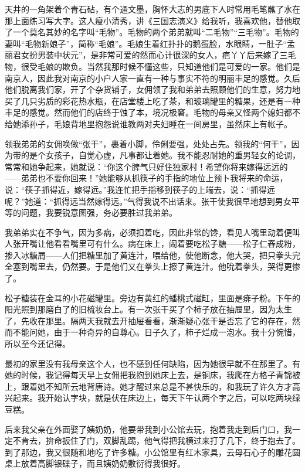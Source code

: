 \par 天井的一角架着个青石砧，有个通文墨，胸怀大志的男底下人时常用毛笔蘸了水在那上面练习写大字。这人瘦小清秀，讲《三国志演义》给我听，我喜欢他，替他取了一个莫名其妙的名字叫“毛物”。毛物的两个弟弟就叫“二毛物”“三毛物”。毛物的妻叫“毛物新娘子”，简称“毛娘”。毛娘生着红扑扑的鹅蛋脸，水眼睛，一肚子“孟丽君女扮男装中状元”，是非常可爱的然而心计很深的女人，疤丫丫后来嫁了三毛物，很受毛娘的欺负。当然我那时候不懂这些，只知道他们是可爱的一家。他们是南京人，因此我对南京的小户人家一直有一种与事实不符的明丽丰足的感觉。久后他们脱离我们家，开了个杂货铺子，女佣领了我和弟弟去照顾他们的生意，努力地买了几只劣质的彩花热水瓶，在店堂楼上吃了茶，和玻璃罐里的糖果，还是有一种丰足的感觉。然而他们的店终于蚀了本，境况极窘。毛物的母亲又怪两个媳妇都不给她添孙子，毛娘背地里抱怨说谁教两对夫妇睡在一间房里，虽然床上有帐子。
\par 领我弟弟的女佣唤做“张干”，裹着小脚，伶俐要强，处处占先。领我的“何干”，因为带的是个女孩子，自觉心虚，凡事都让着她。我不能忍耐她的重男轻女的论调，常常和她争起来，她就说：“你这个脾气只好住独家村！希望你将来嫁得远远的——弟弟也不要你回来！”她能够从抓筷子的手指的地位上预卜我将来的命运，说：“筷子抓得近，嫁得远。”我连忙把手指移到筷子的上端去，说：“抓得远呢？”她道：“抓得远当然嫁得远。”气得我说不出话来。张干使我很早地想到男女平等的问题，我要锐意图强，务必要胜过我弟弟。
\par 我弟弟实在不争气，因为多病，必须扣着吃，因此非常的馋，看见人嘴里动着便叫人张开嘴让他看看嘴里可有什么。病在床上，闹着要吃松子糖——松子仁舂成粉，掺入冰糖屑——人们把糖里加了黄连汁，喂给他，使他断念，他大哭，把只拳头完全塞到嘴里去，仍然要。于是他们又在拳头上擦了黄连汁。他吮着拳头，哭得更惨了。
\par 松子糖装在金耳的小花磁罐里。旁边有黄红的蟠桃式磁缸，里面是痱子粉。下午的阳光照到那磨白了的旧梳妆台上。有一次张干买了个柿子放在抽屉里，因为太生了，先收在那里。隔两天我就去开抽屉看看，渐渐疑心张干是否忘了它的存在，然而不能问她，由于一种奇异的自尊心。日子久了，柿子烂成一泡水。我十分惋惜，所以至今还记得。
\par 最初的家里没有我母亲这个人，也不感到任何缺陷，因为她很早就不在那里了。有她的时候，我记得每天早上女佣把我抱到她床上去，是铜床，我爬在方格子青锦被上，跟着她不知所云地背唐诗。她才醒过来总是不甚快乐的，和我玩了许久方才高兴起来。我开始认字块，就是伏在床边上，每天下午认两个字之后，可以吃两块绿豆糕。
\par 后来我父亲在外面娶了姨奶奶，他要带我到小公馆去玩，抱着我走到后门口，我一定不肯去，拚命扳住了门，双脚乱踢，他气得把我横过来打了几下，终于抱去了。到了那边，我又很随和地吃了许多糖。小公馆里有红木家具，云母石心子的雕花圆桌上放着高脚银碟子，而且姨奶奶敷衍得我很好。

